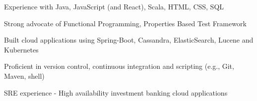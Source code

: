 \begin{cvitems}
\sectionspace
\sectionspace
\vspace{1mm}
	\fontsize{11pt}{1.4em}\bodyfontlight\upshape\color{text}
        \item {Experience with Java, JavaScript (and React), Scala, HTML, CSS, SQL}
        \item {Strong advocate of Functional Programming, Properties Based Test Framework}
        \item {Built cloud applications using Spring-Boot, Cassandra, ElasticSearch, Lucene and Kubernetes}
        \item {Proficient in version control, continuous integration and scripting (e.g., Git, Maven, shell)}
        \item {SRE experience - High availability investment banking cloud applications}
        \end{cvitems}
\vspace{1mm}
\sectionspace
